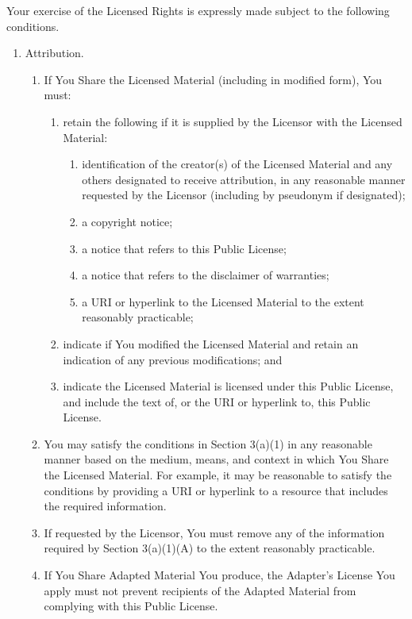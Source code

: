 Your exercise of the Licensed Rights is expressly made subject to the
following conditions.

\begin{enumerate}
\item
  Attribution.

  \begin{enumerate}
  \item
    If You Share the Licensed Material (including in modified form), You
    must:

    \begin{enumerate}
    \item
      retain the following if it is supplied by the Licensor with the
      Licensed Material:

      \begin{enumerate}
      \item
        identification of the creator(s) of the Licensed Material and
        any others designated to receive attribution, in any reasonable
        manner requested by the Licensor (including by pseudonym if
        designated);
      \item
        a copyright notice;
      \item
        a notice that refers to this Public License;
      \item
        a notice that refers to the disclaimer of warranties;
      \item
        a URI or hyperlink to the Licensed Material to the extent
        reasonably practicable;
      \end{enumerate}
    \item
      indicate if You modified the Licensed Material and retain an
      indication of any previous modifications;
      and
    \item
      indicate the Licensed Material is licensed under this Public
      License, and include the text of, or the URI or hyperlink to, this
      Public License.
    \end{enumerate}
  \item
    You may satisfy the conditions in Section 3(a)(1) in any reasonable
    manner based on the medium, means, and context in which You Share
    the Licensed Material.
    For example, it may be reasonable to satisfy
    the conditions by providing a URI or hyperlink to a resource that
    includes the required information.
  \item
    If requested by the Licensor, You must remove any of the information
    required by Section 3(a)(1)(A) to the extent reasonably practicable.
  \item
    If You Share Adapted Material You produce, the Adapter's License You
    apply must not prevent recipients of the Adapted Material from
    complying with this Public License.
  \end{enumerate}
\end{enumerate}

